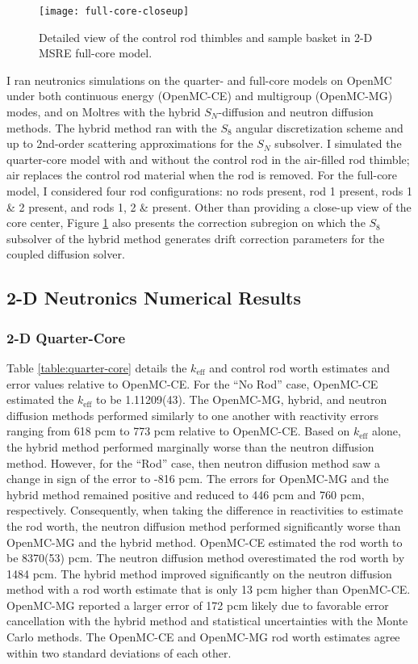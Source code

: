 \begin{figure}[htb!]
  \centering
  \texttt{[image: full-core-closeup]}
  \caption{Detailed view of the control rod thimbles and sample basket in 2-D \gls{MSRE} full-core
    model.}
  \label{fig:full-geom-closeup}
\end{figure}

I ran neutronics simulations on the quarter- and full-core models on OpenMC under both continuous
energy (OpenMC-CE) and multigroup (OpenMC-MG) modes, and on Moltres with the hybrid $S_N$-diffusion
and neutron diffusion methods. The hybrid method ran with the $S_8$ angular discretization scheme
and up to 2nd-order scattering approximations for the $S_N$ subsolver. I simulated the
quarter-core model with and without the control rod in the air-filled rod thimble; air replaces the
control rod material when the rod is removed. For the full-core model, I considered four rod
configurations: no rods present, rod 1 present, rods 1 \& 2 present, and rods 1, 2 \& present.
Other than providing a close-up view of the core center, Figure \ref{fig:full-geom-closeup} also
presents the correction subregion on which the $S_8$ subsolver of the hybrid method generates
drift correction parameters for the coupled diffusion solver.

\FloatBarrier

\subsection{2-D Neutronics Numerical Results} \label{sec:2d-nts-results}

\subsubsection{2-D Quarter-Core}

Table \ref{table:quarter-core} details the $k_\text{eff}$ and control rod worth estimates and error
values relative to OpenMC-CE. For the ``No Rod'' case, OpenMC-CE estimated the $k_\text{eff}$ to be
1.11209(43). The OpenMC-MG, hybrid, and neutron diffusion methods performed
similarly to one another with reactivity errors ranging from 618 pcm to 773 pcm relative to
OpenMC-CE. Based on $k_\text{eff}$ alone, the hybrid method performed marginally worse than the
neutron diffusion method. However, for the ``Rod'' case, then neutron diffusion method saw a
change in sign of the error to -816 pcm. The errors for OpenMC-MG and the hybrid method
remained positive and reduced to 446 pcm and 760 pcm, respectively. Consequently, when taking the
difference in reactivities to estimate the rod worth, the neutron diffusion method performed
significantly worse than OpenMC-MG and the hybrid method. OpenMC-CE estimated the rod worth to be
8370(53) pcm. The neutron diffusion method overestimated the rod worth by 1484 pcm. The hybrid
method improved significantly on the neutron diffusion method with a rod worth estimate that is
only 13 pcm
higher than OpenMC-CE. OpenMC-MG reported a larger error of 172 pcm likely due to favorable error
cancellation with the hybrid method and statistical uncertainties with the Monte Carlo methods.
The OpenMC-CE and OpenMC-MG rod worth estimates agree within two standard deviations of each other.


